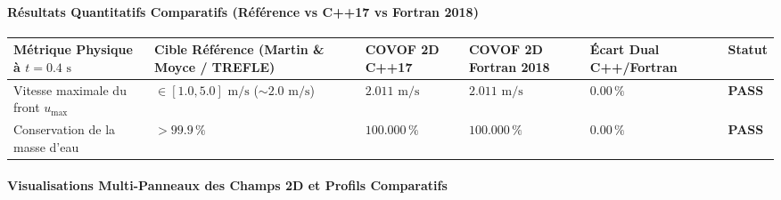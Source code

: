 \documentclass[
  10pt,
]{article}
\newcounter{none} %
\begin{document}
\paragraph{Résultats Quantitatifs Comparatifs (Référence vs C++17 vs
Fortran
2018)}\label{ruxe9sultats-quantitatifs-comparatifs-ruxe9fuxe9rence-vs-c17-vs-fortran-2018-10}

{\def\LTcaptype{none} %
\begin{longtable}[]{@{}
  >{\raggedright\arraybackslash}p{}
  >{\centering\arraybackslash}p{}
  >{\centering\arraybackslash}p{}
  >{\centering\arraybackslash}p{}
  >{\centering\arraybackslash}p{}
  >{\centering\arraybackslash}p{}@{}}
\toprule\noalign{}
\begin{minipage}[b]{\linewidth}\raggedright
Métrique Physique à \(t = 0.4\text{ s}\)
\end{minipage} & \begin{minipage}[b]{\linewidth}\centering
Cible Référence (Martin \& Moyce / TREFLE)
\end{minipage} & \begin{minipage}[b]{\linewidth}\centering
COVOF 2D C++17
\end{minipage} & \begin{minipage}[b]{\linewidth}\centering
COVOF 2D Fortran 2018
\end{minipage} & \begin{minipage}[b]{\linewidth}\centering
Écart Dual C++/Fortran
\end{minipage} & \begin{minipage}[b]{\linewidth}\centering
Statut
\end{minipage} \\
\midrule\noalign{}
\endhead
\bottomrule\noalign{}
\endlastfoot
Vitesse maximale du front \(u_{\max}\) & \(\in [1.0, 5.0]\text{ m/s}\)
(\(\sim 2.0\text{ m/s}\)) & \textbf{\(2.011\text{ m/s}\)} &
\textbf{\(2.011\text{ m/s}\)} & \textbf{\(0.00\,\%\)} & \textbf{PASS} \\
Conservation de la masse d'eau & \(> 99.9\,\%\) &
\textbf{\(100.000\,\%\)} & \textbf{\(100.000\,\%\)} &
\textbf{\(0.00\,\%\)} & \textbf{PASS} \\
\end{longtable}
}

\paragraph{Visualisations Multi-Panneaux des Champs 2D et Profils
Comparatifs}\label{visualisations-multi-panneaux-des-champs-2d-et-profils-comparatifs-10}
\end{document}
